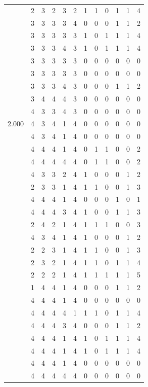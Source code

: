 \documentclass[]{book}
\theoremstyle{definition}
\theoremstyle{definition}
\theoremstyle{definition}
\theoremstyle{remark}
\begin{document}
\begin{table}
{\begin{tabular}[t]{rrrrrrrrrrrr}
 & 2 & 3 & 2 & 3 & 2 & 1 & 1 & 0 & 1 & 1 & 4\\
 & 3 & 3 & 3 & 3 & 4 & 0 & 0 & 0 & 1 & 1 & 2\\
 & 3 & 3 & 3 & 3 & 3 & 1 & 0 & 1 & 1 & 1 & 4\\
 & 3 & 3 & 3 & 4 & 3 & 1 & 0 & 1 & 1 & 1 & 4\\
 & 3 & 3 & 3 & 3 & 3 & 0 & 0 & 0 & 0 & 0 & 0\\
 & 3 & 3 & 3 & 3 & 3 & 0 & 0 & 0 & 0 & 0 & 0\\
 & 3 & 3 & 3 & 4 & 3 & 0 & 0 & 0 & 1 & 1 & 2\\
 & 3 & 4 & 4 & 4 & 3 & 0 & 0 & 0 & 0 & 0 & 0\\
 & 4 & 3 & 3 & 4 & 3 & 0 & 0 & 0 & 0 & 0 & 0\\
2.000 & 4 & 3 & 4 & 1 & 4 & 0 & 0 & 0 & 0 & 0 & 0\\
 & 4 & 3 & 4 & 1 & 4 & 0 & 0 & 0 & 0 & 0 & 0\\
 & 4 & 4 & 4 & 1 & 4 & 0 & 1 & 1 & 0 & 0 & 2\\
 & 4 & 4 & 4 & 4 & 4 & 0 & 1 & 1 & 0 & 0 & 2\\
 & 4 & 3 & 3 & 2 & 4 & 1 & 0 & 0 & 0 & 1 & 2\\
 & 2 & 3 & 3 & 1 & 4 & 1 & 1 & 0 & 0 & 1 & 3\\
 & 4 & 4 & 4 & 1 & 4 & 0 & 0 & 0 & 1 & 0 & 1\\
 & 4 & 4 & 4 & 3 & 4 & 1 & 0 & 0 & 1 & 1 & 3\\
 & 2 & 4 & 2 & 1 & 4 & 1 & 1 & 1 & 0 & 0 & 3\\
 & 4 & 3 & 4 & 1 & 4 & 1 & 0 & 0 & 0 & 1 & 2\\
 & 2 & 2 & 3 & 1 & 4 & 1 & 1 & 0 & 0 & 1 & 3\\
 & 2 & 3 & 2 & 1 & 4 & 1 & 1 & 0 & 1 & 1 & 4\\
 & 2 & 2 & 2 & 1 & 4 & 1 & 1 & 1 & 1 & 1 & 5\\
 & 1 & 4 & 4 & 1 & 4 & 0 & 0 & 0 & 1 & 1 & 2\\
 & 4 & 4 & 4 & 1 & 4 & 0 & 0 & 0 & 0 & 0 & 0\\
 & 4 & 4 & 4 & 4 & 1 & 1 & 1 & 0 & 1 & 1 & 4\\
 & 4 & 4 & 4 & 3 & 4 & 0 & 0 & 0 & 1 & 1 & 2\\
 & 4 & 4 & 4 & 1 & 4 & 1 & 0 & 1 & 1 & 1 & 4\\
 & 4 & 4 & 4 & 1 & 4 & 1 & 0 & 1 & 1 & 1 & 4\\
 & 4 & 4 & 4 & 1 & 4 & 0 & 0 & 0 & 0 & 0 & 0\\
 & 4 & 4 & 4 & 4 & 4 & 0 & 0 & 0 & 0 & 0 & 0\\

\end{tabular}}
\end{table}
\end{document}
